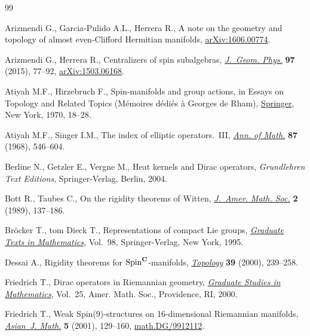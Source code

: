 \documentclass[pdftex]{sigma}
\numberwithin{equation}{section}
\begin{document}
\begin{thebibliography}{99}
\footnotesize\itemsep=0pt

Arizmendi G., Garcia-Pulido A.L., Herrera R., A note on the geometry and
 topology of almost even-{C}lif\/ford {H}ermitian manifolds,
 \href{http://arxiv.org/abs/1606.00774}{arXiv:1606.00774}.

Arizmendi G., Herrera R., Centralizers of spin subalgebras, \href{https://doi.org/10.1016/j.geomphys.2015.07.002}{\textit{J.~Geom.
 Phys.}} \textbf{97} (2015), 77--92, \href{http://arxiv.org/abs/1503.06168}{arXiv:1503.06168}.

Atiyah M.F., Hirzebruch F., Spin-manifolds and group actions, in Essays on
 {T}opology and {R}elated {T}opics ({M}\'emoires d\'edi\'es \`a {G}eorges de
 {R}ham), \href{https://doi.org/10.1007/978-3-642-49197-9_3}{Springer}, New York, 1970, 18--28.

Atiyah M.F., Singer I.M., The index of elliptic operators.~{III}, \href{https://doi.org/10.2307/1970717}{\textit{Ann.
 of Math.}} \textbf{87} (1968), 546--604.

Berline N., Getzler E., Vergne M., Heat kernels and {D}irac operators,
 \textit{Grundlehren Text Editions}, Springer-Verlag, Berlin, 2004.

Bott R., Taubes C., On the rigidity theorems of {W}itten, \href{https://doi.org/10.2307/1990915}{\textit{J.~Amer.
 Math. Soc.}} \textbf{2} (1989), 137--186.

Br\"ocker T., tom Dieck T., Representations of compact {L}ie groups,
 \href{https://doi.org/10.1007/978-3-662-12918-0}{\textit{Graduate Texts in Mathematics}}, Vol.~98, Springer-Verlag, New York,
 1995.

Dessai A., Rigidity theorems for {${\rm Spin}^{\bf C}$}-manifolds,
 \href{https://doi.org/10.1016/S0040-9383(99)00005-1}{\textit{Topology}} \textbf{39} (2000), 239--258.

Friedrich T., Dirac operators in {R}iemannian geometry, \href{https://doi.org/10.1090/gsm/025}{\textit{Graduate
 Studies in Mathematics}}, Vol.~25, Amer. Math. Soc., Providence,
 RI, 2000.

Friedrich T., Weak {S}pin(9)-structures on 16-dimensional {R}iemannian
 manifolds, \href{https://doi.org/10.4310/AJM.2001.v5.n1.a9}{\textit{Asian~J. Math.}} \textbf{5} (2001), 129--160,
 \href{http://arxiv.org/abs/math.DG/9912112}{math.DG/9912112}.


\end{thebibliography}
\end{document}
